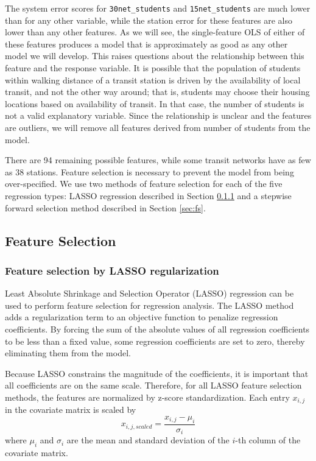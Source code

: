 \documentclass[11pt]{article}
\begin{document}
The system error scores for \texttt{30net\_students} and \texttt{15net\_students} are much lower than for any other variable, while the station error for these features are also lower than any other features. As we will see, the single-feature OLS of either of these features produces a model that is approximately as good as any other model we will develop. This raises questions about the relationship between this feature and the response variable. It is possible that the population of students within walking distance of a transit station is driven by the availability of local transit, and not the other way around; that is, students may choose their housing locations based on availability of transit. In that case, the number of students is not a valid explanatory variable. Since the relationship is unclear and the features are outliers, we will remove all features derived from number of students from the model.

There are 94 remaining possible features, while some transit networks have as few as 38 stations. Feature selection is necessary to prevent the model from being over-specified. We use two methods of feature selection for each of the five regression types: LASSO regression described in Section \ref{sec:lasso} and a stepwise forward selection method described in Section \ref{sec:fs}. 

\subsection{Feature Selection}

\subsubsection{Feature selection by LASSO regularization}\label{sec:lasso}


Least Absolute Shrinkage and Selection Operator (LASSO) regression can be used to perform feature selection for regression analysis. The LASSO method adds a regularization term to an objective function to penalize regression coefficients. By forcing the sum of the absolute values of all regression coefficients to be less than a fixed value, some regression coefficients are set to zero, thereby eliminating them from the model. 

Because LASSO constrains the magnitude of the coefficients, it is important that all coefficients are on the same scale. Therefore, for all LASSO feature selection methods, the features are normalized by z-score standardization. Each entry $x_{i,j}$ in the covariate matrix is scaled by
$$ x_{i, j, scaled} = \frac{x_{i,j} - \mu_i}{\sigma_i}$$ where $\mu_i$ and $\sigma_i$ are the mean and standard deviation of the $i$-th column of the covariate matrix.
\end{document}
